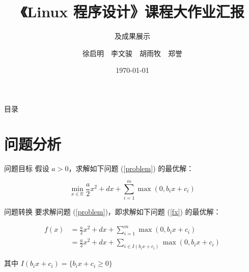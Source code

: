 \documentclass[aspectratio=169]{beamer}
\title{《Linux 程序设计》课程大作业汇报}
\subtitle{及成果展示}
\author{徐启明　李文骏　胡雨牧　郑誉}
\institute{合肥工业大学}
\date{\today}
\begin{document}
\begin{frame}
    \maketitle
\end{frame}

\begin{frame}{目录}
    \tableofcontents
\end{frame}

\section{问题分析}

\begin{frame}[fragile]{问题目标}
    假设 $a>0$，求解如下问题 (\ref{problem}) 的最优解：

    \begin{equation}
        \min_{x\in\mathbb{R}}\frac{a}{2}x^2+dx+\sum^{m}_{i=1}\max(0,b_ix+c_i)\label{problem}
    \end{equation}

    \framebreak
\end{frame}

\begin{frame}[fragile]{问题转换}
    要求解问题 (\ref{problem})，即求解如下问题 (\ref{fx}) 的最优解：

    \begin{align}
        f(x)
         & =\frac{a}{2}x^2+dx+\sum^{m}_{i=1}\max(0,b_ix+c_i)\nonumber           \\
         & =\frac{a}{2}x^2+dx+\sum_{i\in I(b_ix+c_i)}\max(0,b_ix+c_i)\label{fx}
    \end{align}

    其中 $I(b_ix+c_i)=\{b_ix+c_i\ge0\}$
\end{frame}
\end{document}
